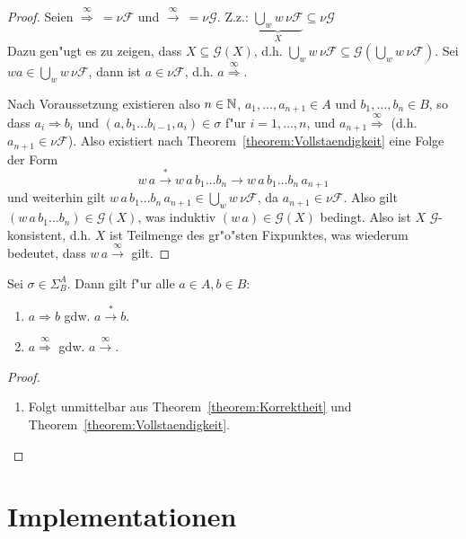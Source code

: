 \documentclass[12pt,a4paper]{article}
\begin{document}
\begin{proof}
  Seien $\stackrel{\infty}{\Rightarrow}\ = \nu\mathcal{F}$
  und $\stackrel{\infty}{\rightarrow}\ = \nu\mathcal{G}$. Z.z.:
  $\underbrace{\bigcup_w w\,\nu\mathcal{F}}_X \subseteq \nu\mathcal{G}$ \\
  Dazu gen"ugt es zu zeigen, dass $X \subseteq \mathcal{G}(X)$, d.h.
  $\bigcup_w w\,\nu\mathcal{F} \subseteq \mathcal{G}(\bigcup_w w\,\nu\mathcal{F})$.
  Sei $wa \in \bigcup_w w\,\nu\mathcal{F}$, dann ist $a \in \nu\mathcal{F}$, d.h. $a \stackrel{\infty}{\Rightarrow}$.

  Nach Voraussetzung existieren also $n \in \mathbb N$, $a_1,\ldots,a_{n+1} \in A$ und
  $b_1,\ldots,b_n \in B$, so dass $a_i \Rightarrow b_i$ und $(a,b_1 \ldots b_{i-1},a_i) \in \sigma$
  f"ur $i=1,\ldots,n$, und $a_{n+1} \stackrel{\infty}{\Rightarrow}$ (d.h. $a_{n+1} \in \nu\mathcal{F}$).
  Also existiert nach Theorem~\ref{theorem:Vollstaendigkeit} eine Folge der Form
  \[
  w\,a \stackrel{*}{\rightarrow} w\,a\,b_1 \ldots b_n \rightarrow w\,a\,b_1 \ldots b_n\,a_{n+1}
  \]
  und weiterhin gilt $w\,a\,b_1 \ldots b_n\,a_{n+1} \in \bigcup_w w\,\nu\mathcal{F}$,
  da $a_{n+1} \in \nu\mathcal{F}$. Also gilt $(w\,a\,b_1 \ldots b_n) \in \mathcal{G}(X)$,
  was induktiv $(w\,a) \in \mathcal{G}(X)$ bedingt. Also ist $X$ $\mathcal{G}$-konsistent,
  d.h. $X$ ist Teilmenge des gr"o"sten Fixpunktes, was wiederum bedeutet, dass
  $w\,a \stackrel{\infty}{\rightarrow}$ gilt.
\end{proof}

\begin{theorem}["Aquivalenz]
  Sei $\sigma \in \Sigma^A_B$. Dann gilt f"ur alle $a \in A, b \in B$:
  \begin{enumerate}
  \item $a \Rightarrow b$ gdw. $a \stackrel{*}{\to} b$.
  \item $a \stackrel{\infty}{\Rightarrow}$ gdw. $a \stackrel{\infty}{\to}$.
  \end{enumerate}
\end{theorem}

\begin{proof} \
  \begin{enumerate}
  \item Folgt unmittelbar aus Theorem~\ref{theorem:Korrektheit} und Theorem~\ref{theorem:Vollstaendigkeit}.
  \end{enumerate}
\end{proof}


\section{Implementationen}
\end{document}
